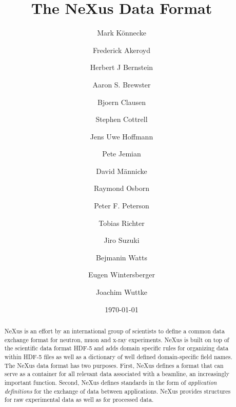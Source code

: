 \documentclass[%
 aip,
rsi,
 amsmath,amssymb,
 reprint,%
]{revtex4-1}
\begin{document}

\title{The NeXus Data Format}


\author{Mark K\"onnecke}
\author{Frederick Akeroyd}

\author{Herbert J Bernstein}

\author{Aaron S. Brewster}

\author{Bjoern Clausen}

\author{Stephen Cottrell}

\author{Jens Uwe Hoffmann}

\author{Pete Jemian}

\author{David M\"annicke}

\author{Raymond Osborn}

\author{Peter F. Peterson}

\author{Tobias Richter}

\author{Jiro Suzuki}


\author{Bejmanin Watts}

\author{Eugen Wintersberger}

\author{Joachim Wuttke}



\date{\today}%

\begin{abstract}
NeXus is an effort by an international group of scientists to define 
 a common data exchange format for neutron, muon and x-ray experiments.   
NeXus is built on top of the scientific data format HDF-5 and adds domain 
specific rules for organizing data within HDF-5 files as well as a dictionary of well 
defined domain-specific field names. The NeXus data format has two purposes.  First, NeXus defines a
format that can serve as a container for all relevant data associated
with a beamline, an increasingly important function.  Second, NeXus
defines standards in the form of \emph{application definitions} for the
exchange of data between applications.  NeXus provides structures for raw experimental data as well as for processed data.  
\end{abstract}
\end{document}
